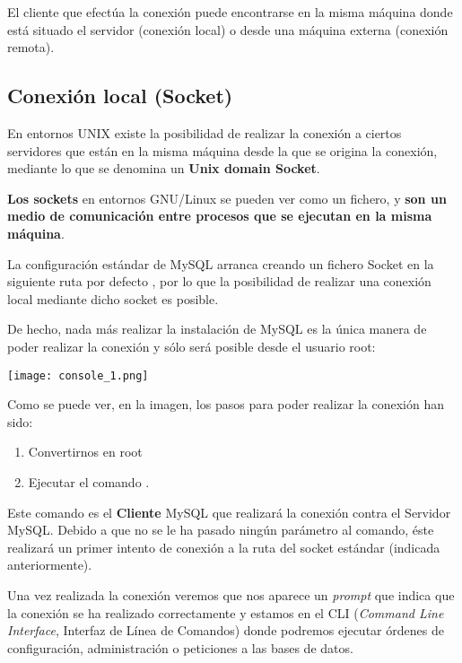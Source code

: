 El cliente que efectúa la conexión puede encontrarse en la misma máquina donde está situado el servidor (conexión local) o desde una máquina externa (conexión remota).


\subsection{Conexión local (Socket)}
En entornos UNIX existe la posibilidad de realizar la conexión a ciertos servidores que están en la misma máquina desde la que se origina la conexión, mediante lo que se denomina un \textbf{Unix domain Socket}.

\textbf{Los sockets} en entornos GNU/Linux se pueden ver como un fichero, y \textbf{son un medio de comunicación entre procesos que se ejecutan en la misma máquina}.

La configuración estándar de MySQL arranca creando un fichero Socket en la siguiente ruta por defecto , por lo que la posibilidad de realizar una conexión local mediante dicho socket es posible.

De hecho, nada más realizar la instalación de MySQL es la única manera de poder realizar la conexión y sólo será posible desde el usuario root:

\begin{center}
    \vspace{-15pt}
    \texttt{[image: console\_1.png]}
    \vspace{-20pt}
\end{center}

Como se puede ver, en la imagen, los pasos para poder realizar la conexión han sido:
\begin{enumerate}
    \item Convertirnos en root
    \item Ejecutar el comando    .
\end{enumerate}

Este comando es el \textbf{Cliente} MySQL que realizará la conexión contra el Servidor MySQL. Debido a que no se le ha pasado ningún parámetro al comando, éste realizará un primer intento de conexión a la ruta del socket estándar (indicada anteriormente).

Una vez realizada la conexión veremos que nos aparece un \textit{prompt}   que indica que la conexión se ha realizado correctamente y estamos en el CLI (\textit{Command Line Interface}, Interfaz de Línea de Comandos) donde podremos ejecutar órdenes de configuración, administración o peticiones a las bases de datos.

